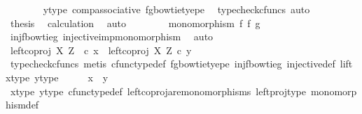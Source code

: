 \begin{isabellebody}
\ \ \ \ \ \ \isamarkupfalse%
\ y{\isacharunderscore}{\kern0pt}type{}\ comp{\isacharunderscore}{\kern0pt}associative{}\ fg{\isacharunderscore}{\kern0pt}bowtie{\isacharunderscore}{\kern0pt}tyepe\ \isamarkupfalse%
\ {\isacharparenleft}{\kern0pt}typecheck{\isacharunderscore}{\kern0pt}cfuncs{\isacharcomma}{\kern0pt}\ auto{\isacharparenright}{\kern0pt}\isanewline
\ \ \ \ \isamarkupfalse%
\ \isamarkupfalse%
\ {\isacharquery}{\kern0pt}thesis\ \isamarkupfalse%
\ calculation\ \isamarkupfalse%
\ auto\isanewline
\ \ \isamarkupfalse%
\isanewline
\ \ \isamarkupfalse%
\ \isamarkupfalse%
\ {\isachardoublequoteopen}monomorphism\ {\isacharparenleft}{\kern0pt}f\ {\isasymbowtie}\isactrlsub f\ g{\isacharparenright}{\kern0pt}{\isachardoublequoteclose}\isanewline
\ \ \ \ \isamarkupfalse%
\ inj{\isacharunderscore}{\kern0pt}f{\isacharunderscore}{\kern0pt}bowtie{\isacharunderscore}{\kern0pt}g\ injective{\isacharunderscore}{\kern0pt}imp{\isacharunderscore}{\kern0pt}monomorphism\ \isamarkupfalse%
\ auto\isanewline
\ \ \isamarkupfalse%
\ \isamarkupfalse%
\ {\isachardoublequoteopen}left{\isacharunderscore}{\kern0pt}coproj\ X\ Z\ \ {\isasymcirc}\isactrlsub c\ x\ {\isacharequal}{\kern0pt}\ left{\isacharunderscore}{\kern0pt}coproj\ X\ Z\ {\isasymcirc}\isactrlsub c\ y{\isachardoublequoteclose}\isanewline
\ \ \ \ \isamarkupfalse%
\ {\isacharparenleft}{\kern0pt}typecheck{\isacharunderscore}{\kern0pt}cfuncs{\isacharcomma}{\kern0pt}\ metis\ cfunc{\isacharunderscore}{\kern0pt}type{\isacharunderscore}{\kern0pt}def\ fg{\isacharunderscore}{\kern0pt}bowtie{\isacharunderscore}{\kern0pt}tyepe\ inj{\isacharunderscore}{\kern0pt}f{\isacharunderscore}{\kern0pt}bowtie{\isacharunderscore}{\kern0pt}g\ injective{\isacharunderscore}{\kern0pt}def\ lift\ x{\isacharunderscore}{\kern0pt}type{}\ y{\isacharunderscore}{\kern0pt}type{}{\isacharparenright}{\kern0pt}\isanewline
\ \ \isamarkupfalse%
\ \isamarkupfalse%
\ {\isachardoublequoteopen}x\ {\isacharequal}{\kern0pt}\ y{\isachardoublequoteclose}\isanewline
\ \ \ \ \isamarkupfalse%
\ x{\isacharunderscore}{\kern0pt}type{}\ y{\isacharunderscore}{\kern0pt}type{}\ cfunc{\isacharunderscore}{\kern0pt}type{\isacharunderscore}{\kern0pt}def\ left{\isacharunderscore}{\kern0pt}coproj{\isacharunderscore}{\kern0pt}are{\isacharunderscore}{\kern0pt}monomorphisms\ left{\isacharunderscore}{\kern0pt}proj{\isacharunderscore}{\kern0pt}type\ monomorphism{\isacharunderscore}{\kern0pt}def\ \isamarkupfalse%

\end{isabellebody}

